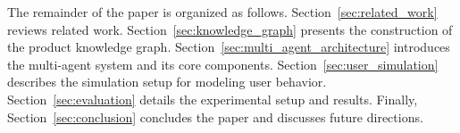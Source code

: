 \documentclass[conference]{IEEEtran}
\begin{document}
The remainder of the paper is organized as follows. Section~\ref{sec:related_work} reviews related work. Section~\ref{sec:knowledge_graph} presents the construction of the product knowledge graph. Section~\ref{sec:multi_agent_architecture} introduces the multi-agent system and its core components. Section~\ref{sec:user_simulation} describes the simulation setup for modeling user behavior. Section~\ref{sec:evaluation} details the experimental setup and results. Finally, Section~\ref{sec:conclusion} concludes the paper and discusses future directions.





















\end{document}
